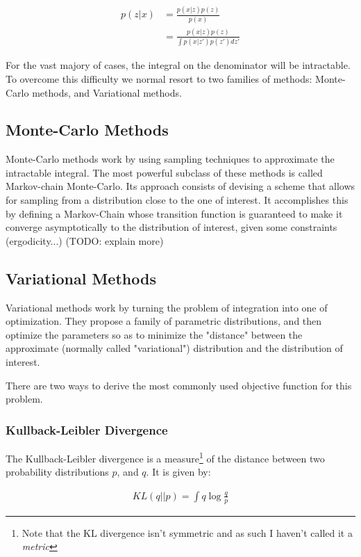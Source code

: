 \begin{align}
    p(z|x) &= \frac{p(x|z)p(z)}{p(x)} \\
           &= \frac{p(x|z)p(z)}{\int p(x|z')p(z') dz'}
\end{align}

For the vast majory of cases, the integral on the denominator will be
intractable. To overcome this difficulty we normal resort to two families
of methods: Monte-Carlo methods, and Variational methods.

\subsection{Monte-Carlo Methods}
\label{subsection:mcmc}

Monte-Carlo methods work by using sampling techniques to approximate the
intractable integral. The most powerful subclass of these methods is called
Markov-chain Monte-Carlo. Its approach consists of devising a scheme that
allows for sampling from a distribution close to the one of interest. It
accomplishes this by defining a Markov-Chain whose transition function 
is guaranteed to make it converge asymptotically to the distribution of interest,
given some constraints (ergodicity...) (TODO: explain more)

\subsection{Variational Methods}
\label{subsection:variational}
Variational methods work by turning the problem of integration into one of
optimization. They propose a family of parametric distributions, and then
optimize the parameters so as to minimize the "distance" between the approximate
(normally called "variational") distribution and the distribution of interest.

There are two ways to derive the most commonly used objective function for
this problem.

\subsubsection{Kullback-Leibler Divergence}
\label{subsubsection:kldiv}

The Kullback-Leibler divergence is a measure\footnote{Note that the KL divergence
isn't symmetric and as such I haven't called it a \emph{metric}} of the distance
between two probability distributions $p$, and $q$. It is given by:

\begin{align}
    KL(q||p) = \int q \log\frac{q}{p}
\end{align}

